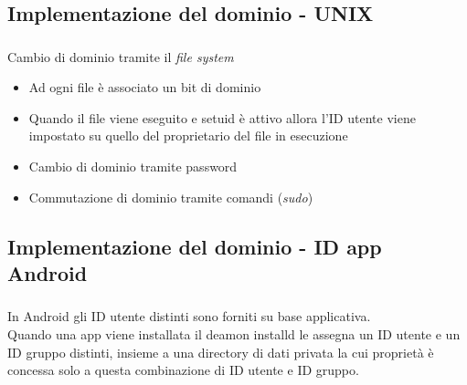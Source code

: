 \documentclass{beamer}
\newenvironment{mainframe}{
	\begin{frame}
		\frametitle{\insertsubsection}
		\framesubtitle{\insertsection}
	}{
	\end{frame}
}
\begin{document}
\subsection{Implementazione del dominio - UNIX}
\begin{mainframe}
	Cambio di dominio tramite il \textit{file system}
	\begin{itemize}
		\item Ad ogni file è associato un bit di dominio
		\item Quando il file viene eseguito e setuid è attivo allora l'ID utente viene impostato su quello del proprietario del file in esecuzione
		\item Cambio di dominio tramite password
		\item Commutazione di dominio tramite comandi (\textit{sudo})
	\end{itemize}
\end{mainframe}
\subsection{Implementazione del dominio - ID app Android}
\begin{mainframe}
	In Android gli ID utente distinti sono forniti su base applicativa.\\
	Quando una app viene installata il deamon installd le assegna un ID utente e un ID gruppo distinti, insieme a una directory di dati privata la cui proprietà è concessa solo a questa combinazione di ID utente e ID gruppo.
\end{mainframe}
\end{document}
